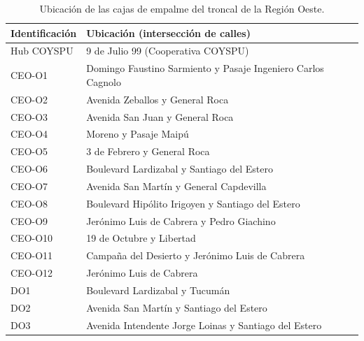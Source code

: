 \begin{table}[H]\centering\footnotesize
\caption{Ubicación de las cajas de empalme del troncal de la Región Oeste.}\label{tab:nodos_O}
\begin{tabular}{|l|l|}\hline \textbf{Identificación} & \textbf{Ubicación (intersección de calles)} \\ \hline
Hub COYSPU & 9 de Julio 99 (Cooperativa COYSPU) \\ \hline
CEO-O1 & Domingo Faustino Sarmiento y Pasaje Ingeniero Carlos Cagnolo \\ \hline
CEO-O2 & Avenida Zeballos y General Roca \\ \hline
CEO-O3 & Avenida San Juan y General Roca \\ \hline
CEO-O4 & Moreno y Pasaje Maipú \\ \hline
CEO-O5 & 3 de Febrero y General Roca \\ \hline
CEO-O6 & Boulevard Lardizabal y Santiago del Estero \\ \hline
CEO-O7 & Avenida San Martín y General Capdevilla \\ \hline
CEO-O8 & Boulevard Hipólito Irigoyen y Santiago del Estero \\ \hline
CEO-O9 & Jerónimo Luis de Cabrera y Pedro Giachino \\ \hline
CEO-O10 & 19 de Octubre y Libertad \\ \hline
CEO-O11 & Campaña del Desierto y Jerónimo Luis de Cabrera \\ \hline
CEO-O12 & Jerónimo Luis de Cabrera \\ \hline
DO1 & Boulevard Lardizabal y Tucumán \\ \hline
DO2 & Avenida San Martín y Santiago del Estero \\ \hline
DO3 & Avenida Intendente Jorge Loinas y Santiago del Estero \\ \hline
\end{tabular}\end{table}
